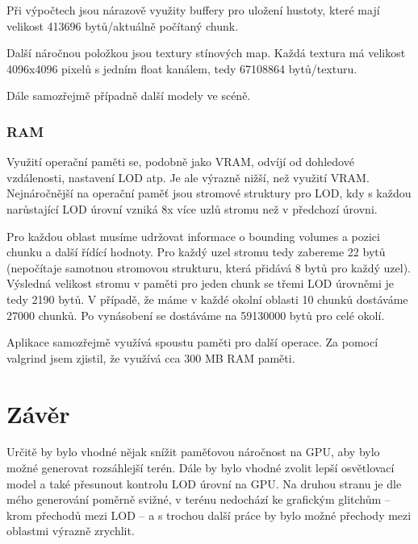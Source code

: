 \documentclass[12pt,a4paper,titlepage,final]{report}
\begin{document}
Při výpočtech jsou nárazově využity buffery pro uložení hustoty, které mají velikost 413696 bytů/aktuálně počítaný chunk.

Další náročnou položkou jsou textury stínových map. Každá textura má velikost 4096x4096 pixelů s jedním float kanálem, tedy 67108864 bytů/texturu.

Dále samozřejmě případně další modely ve scéně.

\subsubsection{RAM}
Využití operační paměti se, podobně jako VRAM, odvíjí od dohledové vzdálenosti, nastavení LOD atp. Je ale výrazně nižší, než využití VRAM. Nejnáročnější na operační paměť jsou stromové struktury pro LOD, kdy s každou narůstající LOD úrovní vzniká 8x více uzlů stromu než v předchozí úrovni. 

Pro každou oblast musíme udržovat informace o bounding volumes a pozici chunku a další řídící hodnoty. Pro každý uzel stromu tedy zabereme 22 bytů (nepočítaje samotnou stromovou strukturu, která přidává 8 bytů pro každý uzel). Výsledná velikost stromu v paměti pro jeden chunk se třemi LOD úrovněmi je tedy 2190 bytů. V případě, že máme v každé okolní oblasti 10 chunků dostáváme 27000 chunků. Po vynásobení se dostáváme na 59130000 bytů pro celé okolí. 

Aplikace samozřejmě využívá spoustu paměti pro další operace. Za pomocí valgrind jsem zjistil, že využívá cca 300 MB RAM paměti.
\section{Závěr}
Určitě by bylo vhodné nějak snížit paměťovou náročnost na GPU, aby bylo možné generovat rozsáhlejší terén. Dále by bylo vhodné zvolit lepší osvětlovací model a také přesunout kontrolu LOD úrovní na GPU. Na druhou stranu je dle mého generování poměrně svižné, v terénu nedochází ke grafickým glitchům -- krom přechodů mezi LOD -- a s trochou další práce by bylo možné přechody mezi oblastmi výrazně zrychlit.

\nocite{nguyen_2008}
\nocite{cascaded_sm}


\begin{flushleft}
  
\end{flushleft}
\end{document}
